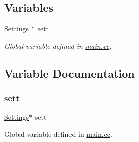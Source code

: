 \subsection*{Variables}
\begin{DoxyCompactItemize}
\item 
\mbox{\hyperlink{class_settings}{Settings}} $\ast$ \mbox{\hyperlink{settings_8hh_a4f37177ee03b8ce3859a16bb3d82f189}{sett}}
\begin{DoxyCompactList}\small\item\em Global variable defined in \mbox{\hyperlink{main_8cc}{main.\+cc}}. \end{DoxyCompactList}\end{DoxyCompactItemize}


\subsection{Variable Documentation}
\mbox{\label{settings_8hh_a4f37177ee03b8ce3859a16bb3d82f189}} 
\subsubsection{\texorpdfstring{sett}{sett}}
{\footnotesize\ttfamily \mbox{\hyperlink{class_settings}{Settings}}$\ast$ sett}



Global variable defined in \mbox{\hyperlink{main_8cc}{main.\+cc}}. 

